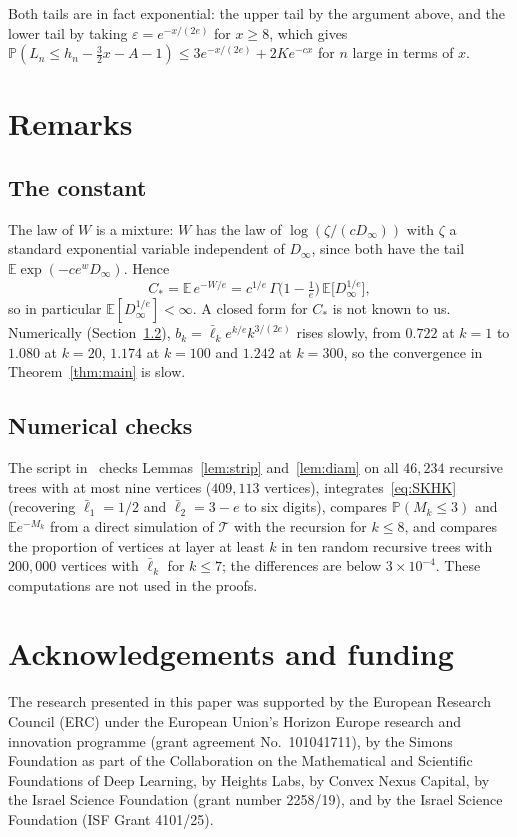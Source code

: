 \documentclass[11pt]{amsart}
\theoremstyle{definition}
\theoremstyle{remark}
\numberwithin{equation}{section}
\newcommand{\PP}{\mathbb P}
\newcommand{\E}{\mathbb E}
\newcommand{\cT}{\mathcal T}
\newcommand{\lb}{\bar\ell}
\newcommand{\eps}{\varepsilon}
\begin{document}
Both tails are in fact exponential: the upper tail by the argument above, and the lower tail by taking $\eps=e^{-x/(2e)}$ for $x\ge8$, which gives $\PP(L_n\le h_n-\tfrac32x-A-1)\le3e^{-x/(2e)}+2Ke^{-cx}$ for $n$ large in terms of $x$.

\section{Remarks}\label{sec:remarks}

\subsection{The constant}
The law of $W$ is a mixture: $W$ has the law of $\log(\zeta/(cD_\infty))$ with $\zeta$ a standard exponential variable independent of $D_\infty$, since both have the tail $\E\exp(-ce^wD_\infty)$. Hence
\[
C_*=\E\,e^{-W/e}=c^{1/e}\,\Gamma\big(1-\tfrac1e\big)\,\E\big[D_\infty^{1/e}\big],
\]
so in particular $\E[D_\infty^{1/e}]<\infty$. A closed form for $C_*$ is not known to us. Numerically (Section~\ref{sec:num}), $b_k=\lb_k e^{k/e}k^{3/(2e)}$ rises slowly, from $0.722$ at $k=1$ to $1.080$ at $k=20$, $1.174$ at $k=100$ and $1.242$ at $k=300$, so the convergence in Theorem~\ref{thm:main} is slow.

\subsection{Numerical checks}\label{sec:num}
The script in~\cite{code} checks Lemmas~\ref{lem:strip} and~\ref{lem:diam} on all $46{,}234$ recursive trees with at most nine vertices ($409{,}113$ vertices), integrates~\eqref{eq:SKHK} (recovering $\lb_1=1/2$ and $\lb_2=3-e$ to six digits), compares $\PP(M_k\le3)$ and $\E e^{-M_k}$ from a direct simulation of $\cT$ with the recursion for $k\le8$, and compares the proportion of vertices at layer at least $k$ in ten random recursive trees with $200{,}000$ vertices with $\lb_k$ for $k\le7$; the differences are below $3\times10^{-4}$. These computations are not used in the proofs.

\section*{Acknowledgements and funding}
The research presented in this paper was supported by the European Research
Council (ERC) under the European Union's Horizon Europe research and
innovation programme (grant agreement No.~101041711), by the Simons
Foundation as part of the Collaboration on the Mathematical and Scientific
Foundations of Deep Learning, by Heights Labs, by Convex Nexus Capital, by
the Israel Science Foundation (grant number 2258/19), and by the Israel
Science Foundation (ISF Grant 4101/25).
\end{document}
